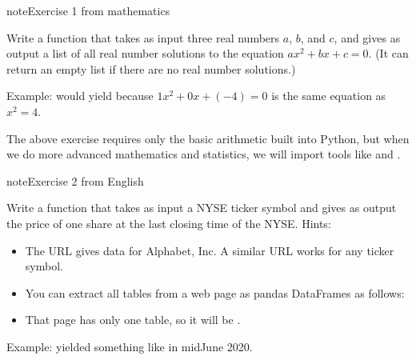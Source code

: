 \documentclass[letterpaper,10pt,english]{jupyterBook}
\begin{document}
\begin{sphinxadmonition}{note}{Exercise 1 \sphinxhyphen{} from mathematics}

\sphinxAtStartPar
Write a function  that takes as input three real numbers \(a\), \(b\), and \(c\), and gives as output a list of all real number solutions to the equation \(ax^2+bx+c=0\).  (It can return an empty list if there are no real number solutions.)

\sphinxAtStartPar
Example:  would yield \sphinxcode{\sphinxupquote{{[}\sphinxhyphen{}2,2{]}}} because \(1x^2+0x+(-4)=0\) is the same equation as \(x^2=4\).
\end{sphinxadmonition}

\sphinxAtStartPar
The above exercise requires only the basic arithmetic built into Python, but when we do more advanced mathematics and statistics, we will import tools like  and .

\begin{sphinxadmonition}{note}{Exercise 2 \sphinxhyphen{} from English}

\sphinxAtStartPar
Write a function  that takes as input a NYSE ticker symbol and gives as output the price of one share at the last closing time of the NYSE.  Hints:
\begin{itemize}
\item {} 
\sphinxAtStartPar
The URL  gives data for Alphabet, Inc.  A similar URL works for any ticker symbol.

\item {} 
\sphinxAtStartPar
You can extract all tables from a web page as pandas DataFrames as follows:

\end{itemize}

\begin{sphinxVerbatim}[commandchars=\\\{\}]
    
\end{sphinxVerbatim}
\begin{itemize}
\item {} 
\sphinxAtStartPar
That page has only one table, so it will be .

\end{itemize}

\sphinxAtStartPar
Example:  yielded something like  in mid\sphinxhyphen{}June 2020.
\end{sphinxadmonition}
\end{document}
